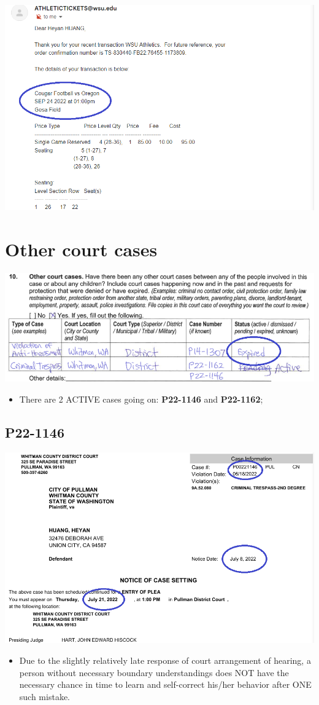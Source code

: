 \documentclass[9pt, b5paper]{article}
\begin{document}
\begin{itemize}
\includegraphics[width=.9\linewidth]{./pic/dearCousin_20220920_104317.png}
\end{itemize}

\section{Other court cases}
\label{sec-2}

\includegraphics[width=.9\linewidth]{./pic/dearCousin_20220919_153339.png}
\begin{itemize}
\item There are 2 ACTIVE cases going on: \textbf{P22-1146} and \textbf{P22-1162};
\end{itemize}
\subsection{\textbf{P22-1146}}
\label{sec-2-1}

\includegraphics[width=.9\linewidth]{./pic/dearCousin_20220919_185022.png}
\begin{itemize}
\item Due to the slightly relatively late response of court arrangement of hearing, a person without necessary boundary understandings does NOT have the necessary chance in time to learn and self-correct his/her behavior after ONE such mistake.
\end{itemize}
\end{document}

